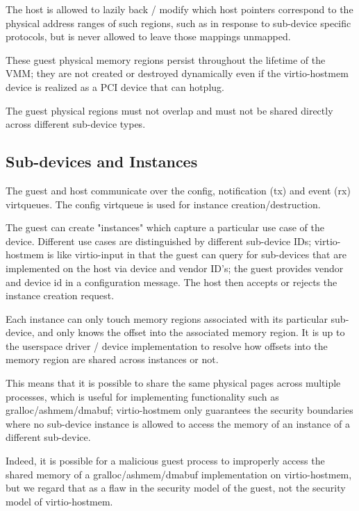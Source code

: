 The host is allowed to lazily back / modify which host pointers
correspond to the physical address ranges of such regions,
such as in response to sub-device specific protocols,
but is never allowed to leave those mappings unmapped.

These guest physical memory regions persist throughout the lifetime of the VMM;
they are not created or destroyed dynamically even if the virtio-hostmem device
is realized as a PCI device that can hotplug.

The guest physical regions must not overlap and must not be shared
directly across different sub-device types.

\subsection{Sub-devices and Instances}\label{sec:Device Types / Host Memory Device / Sub-devices and Instances}

The guest and host communicate
over the config, notification (tx) and event (rx) virtqueues.
The config virtqueue is used for instance creation/destruction.

The guest can create "instances" which capture
a particular use case of the device.
Different use cases are distinguished by different sub-device IDs;
virtio-hostmem is like virtio-input in that the guest can query
for sub-devices that are implemented on the host via device and vendor ID's;
the guest provides vendor and device id in a configuration message.
The host then accepts or rejects the instance creation request.

Each instance can only touch memory regions
associated with its particular sub-device,
and only knows the offset into the associated memory region.
It is up to the userspace driver / device implementation to
resolve how offsets into the memory region are shared across instances or not.

This means that it is possible to share the same physical pages across multiple processes,
which is useful for implementing functionality such as gralloc/ashmem/dmabuf;
virtio-hostmem only guarantees the security boundaries where
no sub-device instance is allowed to access the memory of an instance of
a different sub-device.

Indeed, it is possible for a malicious guest process to improperly access
the shared memory of a gralloc/ashmem/dmabuf implementation on virtio-hostmem,
but we regard that as a flaw in the security model of the guest,
not the security model of virtio-hostmem.

